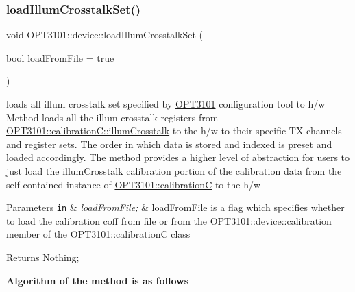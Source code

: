 \subsubsection{\texorpdfstring{load\+Illum\+Crosstalk\+Set()}{loadIllumCrosstalkSet()}}
{\footnotesize\ttfamily void O\+P\+T3101\+::device\+::load\+Illum\+Crosstalk\+Set (\begin{DoxyParamCaption}\item[{bool}]{load\+From\+File = {\ttfamily true} }\end{DoxyParamCaption})}



loads all illum crosstalk set specified by \mbox{\hyperlink{namespace_o_p_t3101}{O\+P\+T3101}} configuration tool to h/w Method loads all the illum crosstalk registers from \mbox{\hyperlink{class_o_p_t3101_1_1calibration_c_ac09121c7057093506de63d6e2ea3a4b7}{O\+P\+T3101\+::calibration\+C\+::illum\+Crosstalk}} to the h/w to their specific TX channels and register sets. The order in which data is stored and indexed is preset and loaded accordingly. The method provides a higher level of abstraction for users to just load the illum\+Crosstalk calibration portion of the calibration data from the self contained instance of \mbox{\hyperlink{class_o_p_t3101_1_1calibration_c}{O\+P\+T3101\+::calibrationC}} to the h/w 


\begin{DoxyParams}[1]{Parameters}
\mbox{\tt in}  & {\em load\+From\+File;} & load\+From\+File is a flag which specifies whether to load the calibration coff from file or from the \mbox{\hyperlink{class_o_p_t3101_1_1device_a808c6e99f30fc4f21bee018f351f560d}{O\+P\+T3101\+::device\+::calibration}} member of the \mbox{\hyperlink{class_o_p_t3101_1_1calibration_c}{O\+P\+T3101\+::calibrationC}} class \\
\hline
\end{DoxyParams}
\begin{DoxyReturn}{Returns}
Nothing; 
\end{DoxyReturn}
{\bfseries Algorithm of the method is as follows}


